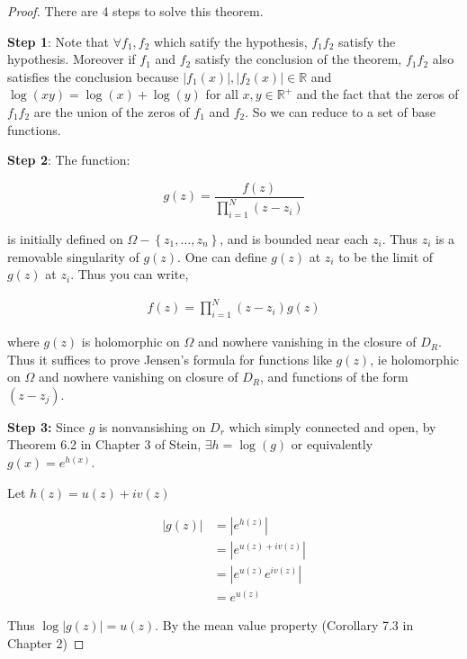 \documentclass{article}
\newcommand{\R}{\mathbb{R}}
\newcommand{\abs}[1]{\left\lvert #1\right\rvert}
\begin{document}
\begin{proof}
    There are 4 steps to solve this theorem. 

    \noindent\textbf{Step 1}: Note that $\forall f_1, f_2$ which satify the hypothesis, $f_1 f_2$ satisfy the hypothesis. Moreover if $f_1$ and $f_2$ satisfy the conclusion of the theorem, $f_1 f_2$ also satisfies the conclusion because $\abs{f_1(x)}, \abs{f_2(x)} \in \R$ and $\log(x y) = \log(x) + \log(y)$ for all $x, y \in \R^+$ and the fact that the zeros of $f_1f_2$ are the union of the zeros of $f_1$ and $f_2$. So we can reduce to a set of base functions. 
    
    \noindent\textbf{Step 2}: The function: 
    
    \begin{equation*}
        g(z) = \frac{f(z)}{\prod_{i = 1}^{N}(z - z_i)}
    \end{equation*}

    is initially defined on $\Omega - \left\{ z_1, \dots, z_n \right\}$, and is bounded near each $z_i$. Thus $z_i$ is a removable singularity of $g(z)$. One can define $g(z)$ at $z_i$ to be the limit of $g(z)$ at $z_i$. Thus you can write, 

    \begin{align*}
        f(z) = \prod_{i = 1}^{N}(z - z_i) g(z)
    \end{align*}

    where $g(z)$ is holomorphic on $\Omega$ and nowhere vanishing in the closure of $D_R$. Thus it suffices to prove Jensen's formula for functions like $g(z)$, ie holomorphic on $\Omega$ and nowhere vanishing on closure of $D_R$, and functions of the form $(z - z_j)$. 
    
    \noindent\textbf{Step 3:} Since $g$ is nonvansishing on $D_r$ which simply connected and open, by Theorem 6.2 in Chapter 3 of Stein, $\exists h = \log(g)$ or equivalently $g(x) = e^{h(x)}$. 
    
    Let $h(z) = u(z) + iv(z)$ 

    \begin{align*}
        \abs{g(z)} &= \abs{e^{h(z)}} \\
        &= \abs{e^{u(z) + i v(z)}} \\
        &= \abs{e^{u(z)}e^{iv(z)}} \\
        &= e^{u(z)}
    \end{align*}

    Thus $\log\abs{g(z)} = u(z)$. By the mean value property (Corollary 7.3 in Chapter 2)
    

\end{proof}
\end{document}
